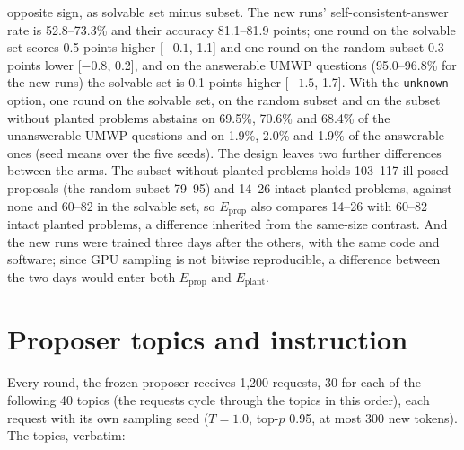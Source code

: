\documentclass[10pt,a4paper]{article}
\newcommand{\unk}{\texttt{unknown}}
\begin{document}
opposite sign, as solvable set minus subset. The new runs' self-consistent-answer rate is 52.8--73.3\% and their accuracy 81.1--81.9 points; one round on the solvable set scores 0.5 points higher [$-0.1$, 1.1] and one round on the random subset 0.3 points lower [$-0.8$, 0.2], and on the answerable UMWP questions (95.0--96.8\% for the new runs) the solvable set is 0.1 points higher [$-1.5$, 1.7]. With the \unk{} option, one round on the solvable set, on the random subset and on the subset without planted problems abstains on 69.5\%, 70.6\% and 68.4\% of the unanswerable UMWP questions and on 1.9\%, 2.0\% and 1.9\% of the answerable ones (seed means over the five seeds). The design leaves two further differences between the arms. The subset without planted problems holds 103--117 ill-posed proposals (the random subset 79--95) and 14--26 intact planted problems, against none and 60--82 in the solvable set, so $E_{\mathrm{prop}}$ also compares 14--26 with 60--82 intact planted problems, a difference inherited from the same-size contrast. And the new runs were trained three days after the others, with the same code and software; since GPU sampling is not bitwise reproducible, a difference between the two days would enter both $E_{\mathrm{prop}}$ and $E_{\mathrm{plant}}$.

\section*{Proposer topics and instruction}

Every round, the frozen proposer receives 1,200 requests, 30 for each of the following 40 topics (the requests cycle through the topics in this order), each request with its own sampling seed ($T{=}1.0$, top-$p$ 0.95, at most 300 new tokens). The topics, verbatim:
\end{document}
